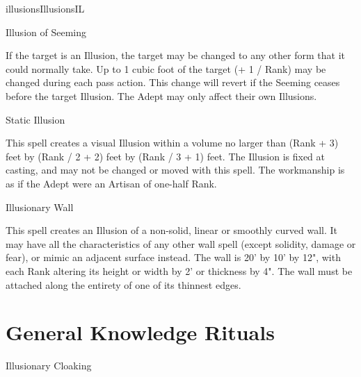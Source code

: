 \begin{College}[1.5]{illusions}{Illusions}{IL}
\begin{spell}[G-6]{Illusion of Seeming}
\begin{effects}
If the target is an Illusion, the target may be changed to any other
form that it could normally take. Up to 1 cubic foot of the target (+
1 / Rank) may be changed during each pass action.  This change will
revert if the Seeming ceases before the target Illusion.  The Adept
may only affect their own Illusions.
\end{effects}
\end{spell}

\begin{spell}[G-7]{Static Illusion}

\begin{effects}
This spell creates a visual Illusion within a volume no larger than
(Rank + 3) feet by (Rank / 2 + 2) feet by (Rank / 3 + 1) feet.  The
Illusion is fixed at casting, and may not be changed or moved with
this spell. The workmanship is as if the Adept were an Artisan of
one-half Rank.
\end{effects}
\end{spell}

\begin{spell}[G-8]{Illusionary Wall}

\begin{effects}
This spell creates an Illusion of a non-solid, linear or smoothly
curved wall.  It may have all the characteristics of any other wall
spell (except solidity, damage or fear), or mimic an adjacent surface
instead. The wall is 20’ by 10’ by 12", with each Rank altering its
height or width by 2’ or thickness by 4".  The wall must be attached
along the entirety of one of its thinnest edges.
\end{effects}
\end{spell}

\section{General Knowledge Rituals}

\begin{ritual}[Q-1]{Illusionary Cloaking}


\end{ritual}
\end{College}
